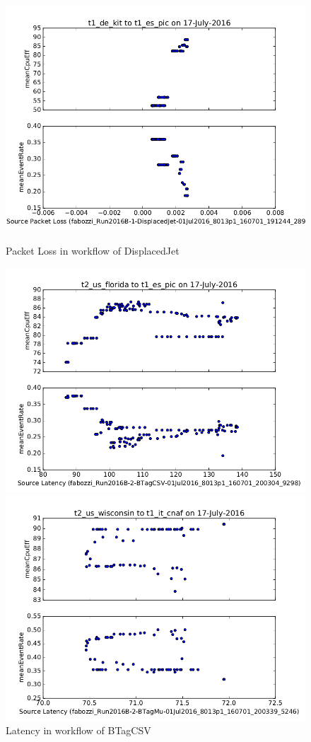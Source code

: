 \documentclass[sigconf]{acmart}
\begin{document}
\begin{figure}[!htb]
		\includegraphics[width=\linewidth]{displacedjet_kit_pic}
		\caption{Packet Loss in workflow of DisplacedJet}
		\label{fig:displacedjet}
	\endminipage\hfill
		\includegraphics[width=\linewidth]{btagcsv_us_pic}
		\caption{Latency in workflow of BTagCSV}
		\label{fig:btagcsv}
	\endminipage\hfill
		\includegraphics[width=\linewidth]{btagmu_us_cnaf}

\end{figure}
\end{document}
